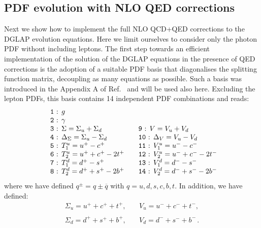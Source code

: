 \subsection{PDF evolution with NLO QED corrections}

Next we show how to implement the full NLO QCD+QED corrections to the
DGLAP evolution equations. Here we limit ourselves to consider only
the photon PDF without including leptons.
%
The first step towards an efficient implementation of the solution of
the DGLAP equations in the presence of QED corrections is the adoption
of a suitable PDF basis that diagonalises the splitting function
matrix, decoupling as many equations as possible.
%
Such a basis was introduced in the Appendix A of
Ref.~\cite{Bertone:2015lqa} and will be used also here.
%
Excluding the lepton PDFs, this basis contains 14 independent PDF
combinations and reads:
\begin{equation}\label{eq:EvolBasis}
\begin{array}{ll}
\mbox{\texttt{ 1} : }g & \\
\mbox{\texttt{ 2} : }\gamma & \\
\mbox{\texttt{ 3} : }\displaystyle \Sigma = \Sigma_u + \Sigma_d & \quad
\mbox{\texttt{9} : }\displaystyle V =V_u +  V_d\\
\mbox{\texttt{ 4} : } \displaystyle \Delta_\Sigma = \Sigma_u - \Sigma_d& \quad\displaystyle 
\mbox{\texttt{10} : } \Delta_V = V_u - V_d\\
\mbox{\texttt{ 5} : }T_1^u = u^+ - c^+ &\quad \mbox{\texttt{11} : }V_1^u = u^- - c^- \\
\mbox{\texttt{ 6} : }T_2^u = u^+ + c^+ - 2t^+ &\quad \mbox{\texttt{12} : }V_2^u = u^- + c^- - 2t^-\\
\mbox{\texttt{ 7} : }T_1^d = d^+ - s^+ &\quad \mbox{\texttt{13} : }V_1^d = d^- - s^- \\
\mbox{\texttt{ 8} : }T_2^d = d^+ + s^+ - 2b^+ &\quad \mbox{\texttt{14}
                                               : }V_2^d = d^- + s^- -
                                               2b^-\\
\end{array}
\end{equation}
where we have defined $q^\pm = q\pm\overline{q}$ with
$q = u,d,s,c,b,t$. In addition, we have defined:
\begin{equation}
\begin{array}{ll}
\Sigma_u = u^++c^++t^+, &\quad V_u = u^-+c^-+t^-,\\
\\
\Sigma_d = d^++s^++b^+,&\quad V_d = d^-+s^-+b^-\,.
\end{array}
\end{equation}

